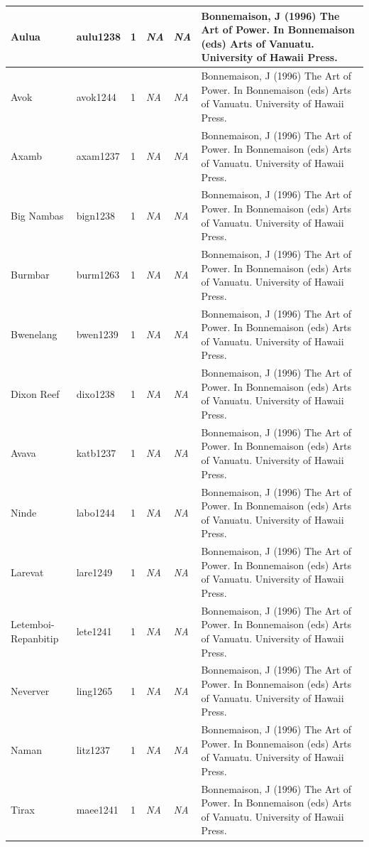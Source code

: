 \documentclass[draft,10pt]{article} %
\begin{document}
\begin{landscape}
\begin{longtable}{ | p{2cm}| p{2cm}| p{1.8cm}| p{1.8cm}| p{3cm}| p{9cm}| }
Aulua&aulu1238&1&\emph{NA}&\emph{NA}&Bonnemaison, J (1996) The Art of Power. In Bonnemaison (eds) Arts of Vanuatu. University of Hawaii Press.\\ \hline
Avok&avok1244&1&\emph{NA}&\emph{NA}&Bonnemaison, J (1996) The Art of Power. In Bonnemaison (eds) Arts of Vanuatu. University of Hawaii Press.\\ \hline
Axamb&axam1237&1&\emph{NA}&\emph{NA}&Bonnemaison, J (1996) The Art of Power. In Bonnemaison (eds) Arts of Vanuatu. University of Hawaii Press.\\ \hline
Big Nambas&bign1238&1&\emph{NA}&\emph{NA}&Bonnemaison, J (1996) The Art of Power. In Bonnemaison (eds) Arts of Vanuatu. University of Hawaii Press.\\ \hline
Burmbar&burm1263&1&\emph{NA}&\emph{NA}&Bonnemaison, J (1996) The Art of Power. In Bonnemaison (eds) Arts of Vanuatu. University of Hawaii Press.\\ \hline
Bwenelang&bwen1239&1&\emph{NA}&\emph{NA}&Bonnemaison, J (1996) The Art of Power. In Bonnemaison (eds) Arts of Vanuatu. University of Hawaii Press.\\ \hline
Dixon Reef&dixo1238&1&\emph{NA}&\emph{NA}&Bonnemaison, J (1996) The Art of Power. In Bonnemaison (eds) Arts of Vanuatu. University of Hawaii Press.\\ \hline
Avava&katb1237&1&\emph{NA}&\emph{NA}&Bonnemaison, J (1996) The Art of Power. In Bonnemaison (eds) Arts of Vanuatu. University of Hawaii Press.\\ \hline
Ninde&labo1244&1&\emph{NA}&\emph{NA}&Bonnemaison, J (1996) The Art of Power. In Bonnemaison (eds) Arts of Vanuatu. University of Hawaii Press.\\ \hline
Larevat&lare1249&1&\emph{NA}&\emph{NA}&Bonnemaison, J (1996) The Art of Power. In Bonnemaison (eds) Arts of Vanuatu. University of Hawaii Press.\\ \hline
Letemboi-Repanbitip&lete1241&1&\emph{NA}&\emph{NA}&Bonnemaison, J (1996) The Art of Power. In Bonnemaison (eds) Arts of Vanuatu. University of Hawaii Press.\\ \hline
Neverver&ling1265&1&\emph{NA}&\emph{NA}&Bonnemaison, J (1996) The Art of Power. In Bonnemaison (eds) Arts of Vanuatu. University of Hawaii Press.\\ \hline
Naman&litz1237&1&\emph{NA}&\emph{NA}&Bonnemaison, J (1996) The Art of Power. In Bonnemaison (eds) Arts of Vanuatu. University of Hawaii Press.\\ \hline
Tirax&maee1241&1&\emph{NA}&\emph{NA}&Bonnemaison, J (1996) The Art of Power. In Bonnemaison (eds) Arts of Vanuatu. University of Hawaii Press.\\ \hline

\end{longtable}
\end{landscape}
\end{document}
